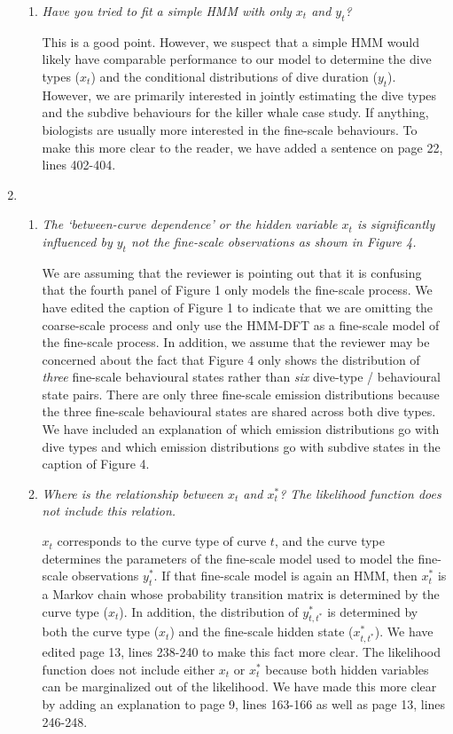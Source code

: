\documentclass{article}
\begin{document}
\begin{enumerate}
\begin{enumerate}
        \item \textit{Have you tried to fit a simple HMM with only $x_t$ and $y_t$?} 
        
        This is a good point. However, we suspect that a simple HMM would likely have comparable performance to our model to determine the dive types ($x_t$) and the conditional distributions of dive duration ($y_t$). However, we are primarily interested in jointly estimating the dive types and the subdive behaviours for the killer whale case study. If anything, biologists are usually more interested in the fine-scale behaviours. To make this more clear to the reader, we have added a sentence on page 22, lines 402-404.
        
    \end{enumerate}
    
    \item \begin{enumerate}
        \item \textit{The `between-curve dependence' or the hidden variable $x_t$ is significantly influenced by $y_t$ not the fine-scale observations as shown in Figure 4.}
        
        We are assuming that the reviewer is pointing out that it is confusing that the fourth panel of Figure 1 only models the fine-scale process. We have edited the caption of Figure 1 to indicate that we are omitting the coarse-scale process and only use the HMM-DFT as a fine-scale model of the fine-scale process. In addition, we assume that the reviewer may be concerned about the fact that Figure 4 only shows the distribution of \textit{three} fine-scale behavioural states rather than \textit{six} dive-type / behavioural state pairs. There are only three fine-scale emission distributions because the three fine-scale behavioural states are shared across both dive types. We have included an explanation of which emission distributions go with dive types and which emission distributions go with subdive states in the caption of Figure 4. 
        
        \item \textit{Where is the relationship between $x_t$ and $x^*_t$? The likelihood function does not include this relation.}
        
        $x_t$ corresponds to the curve type of curve $t$, and the curve type determines the parameters of the fine-scale model used to model the fine-scale observations $y^*_t$. If that fine-scale model is again an HMM, then $x^*_t$ is a Markov chain whose probability transition matrix is determined by the curve type ($x_t$). In addition, the distribution of $y^*_{t,t^*}$ is determined by both the curve type ($x_t$) and the fine-scale hidden state ($x^*_{t,t^*}$). We have edited page 13, lines 238-240 to make this fact more clear. The likelihood function does not include either $x_t$ or $x^*_t$ because both hidden variables can be marginalized out of the likelihood. We have made this more clear by adding an explanation to page 9, lines 163-166 as well as page 13, lines 246-248. 
        

\end{enumerate}
\end{enumerate}
\end{document}
